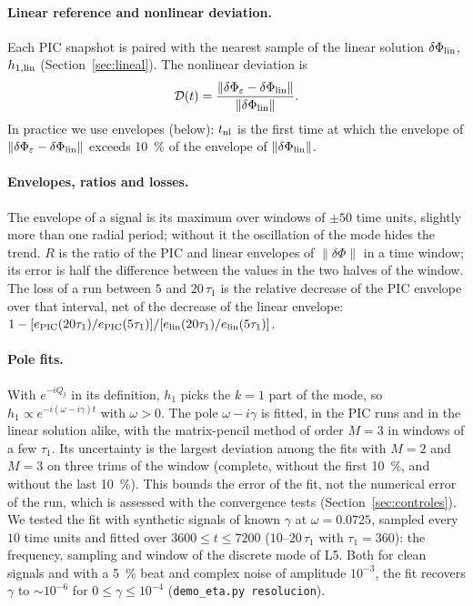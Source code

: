 \documentclass[11pt,a4paper]{article}
\begin{document}
\paragraph{Linear reference and nonlinear deviation.} Each PIC snapshot is paired with
the nearest sample of the linear solution $\delta\Phi_{\rm lin}$, $h_{1,\rm lin}$
(Section~\ref{sec:lineal}). The nonlinear deviation is
\[
  \mathcal D(t)=\frac{\|\delta\Phi_\varepsilon-\delta\Phi_{\rm lin}\|}{\|\delta\Phi_{\rm lin}\|}.
\]
In practice we use envelopes (below): $t_{\rm nl}$ is the first time at which the
envelope of $\|\delta\Phi_\varepsilon-\delta\Phi_{\rm lin}\|$ exceeds \SI{10}{\%} of the
envelope of $\|\delta\Phi_{\rm lin}\|$.

\paragraph{Envelopes, ratios and losses.} The envelope of a signal is its maximum over
windows of $\pm50$ time units, slightly more than one radial period; without it the
oscillation of the mode hides the trend. $R$ is the ratio of the PIC and linear
envelopes of $\|\delta\Phi\|$ in a time window; its error is half the difference between
the values in the two halves of the window. The loss of a run between $5$ and
$20\,\tau_1$ is the relative decrease of the PIC envelope over that interval, net of the
decrease of the linear envelope:
$1-[e_{\rm PIC}(20\tau_1)/e_{\rm PIC}(5\tau_1)]/[e_{\rm lin}(20\tau_1)/e_{\rm lin}(5\tau_1)]$.

\paragraph{Pole fits.} With $e^{-iQ_j}$ in its definition, $h_1$ picks the $k=1$ part of
the mode, so $h_1\propto e^{-i(\omega-i\gamma)t}$ with $\omega>0$. The pole $\omega-i\gamma$ is fitted, in the PIC runs and
in the linear solution alike, with the matrix-pencil method of order $M=3$ in windows of
a few $\tau_1$. Its uncertainty is the largest deviation among the fits with $M=2$ and
$M=3$ on three trims of the window (complete, without the first \SI{10}{\%}, and without
the last \SI{10}{\%}). This bounds the error of the fit, not the numerical error of the
run, which is assessed with the convergence tests (Section~\ref{sec:controles}). We
tested the fit with synthetic signals of known $\gamma$ at $\omega=0.0725$, sampled every
$10$ time units and fitted over $3600\le t\le7200$ ($10$--$20\,\tau_1$ with $\tau_1=360$): the
frequency, sampling and window of the discrete mode of L5. Both for clean signals and
with a \SI{5}{\%} beat and complex noise of amplitude $10^{-3}$, the fit recovers
$\gamma$ to $\sim10^{-6}$ for $0\le\gamma\le10^{-4}$ (\texttt{demo\_eta.py resolucion}).
\end{document}
